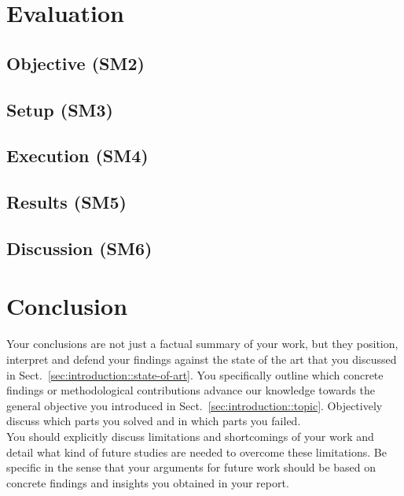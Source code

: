 \documentclass[
	a4paper,
	pagesize,
	pdftex,
	12pt,
	ngerman,
	fleqn,
	final,
	]{scrartcl}
\theoremstyle{plain}
\theoremstyle{definition}
\begin{document}
\section{Evaluation}

	\subsection{Objective (SM2)}
	
	\subsection{Setup (SM3)}
	
	\subsection{Execution (SM4)}
	
	\subsection{Results (SM5)}
	
	\subsection{Discussion (SM6)}

\section{Conclusion}
		Your conclusions are not just a factual summary of your work, but they position, interpret and defend your findings against the state of the art that you discussed in Sect.~\ref{sec:introduction::state-of-art}. You specifically outline which concrete findings or methodological contributions advance our knowledge towards the general objective you introduced in Sect.~\ref{sec:introduction::topic}. Objectively discuss which parts you solved and in which parts you failed. \\
		You should explicitly discuss limitations and shortcomings of your work and detail what kind of future studies are needed to overcome these limitations. Be specific in the sense that your arguments for future work should be based on concrete findings and insights you obtained in your report.






\selbstaendigkeitserklaerung{\today}
\end{document}
